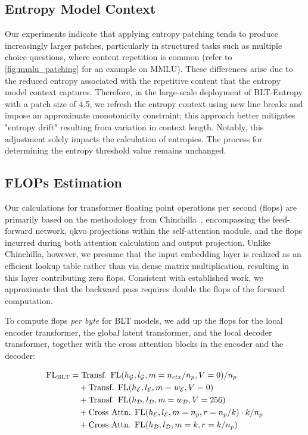 \subsection{Entropy Model Context}
\label{section:entropy-context}
Our experiments indicate that applying entropy patching tends to produce increasingly larger patches, particularly in structured tasks such as multiple choice questions, where content repetition is common (refer to \autoref{fig:mmlu_patching} for an example on MMLU). These differences arise due to the reduced entropy associated with the repetitive content that the entropy model context captures. Therefore, in the large-scale deployment of {\textsc BLT}-Entropy with a patch size of 4.5, we refresh the entropy context using new line breaks and impose an approximate monotonicity constraint; this approach better mitigates "entropy drift" resulting from variation in context length. Notably, this adjustment solely impacts the calculation of entropies. The process for determining the entropy threshold value remains unchanged.

\subsection{FLOPs Estimation} 
\label{section:flops}

Our calculations for transformer floating point operations per second (flops) are primarily based on the methodology from Chinchilla~\citep{hoffmann2022training}, encompassing the feed-forward network, qkvo projections within the self-attention module, and the flops incurred during both attention calculation and output projection. Unlike Chinchilla, however, we presume that the input embedding layer is realized as an efficient lookup table rather than via dense matrix multiplication, resulting in this layer contributing zero flops. Consistent with established work, we approximate that the backward pass requires double the flops of the forward computation.

To compute flops \textit{per byte} for {\textsc BLT} models, we add up the flops for the local encoder transformer, the global latent transformer, and the local decoder transformer, together with the cross attention blocks in the encoder and the decoder:

\begin{align}
    \text{FL}_{\text{{\textsc BLT}}} &= \text{Transf. FL}(h_{\mathcal{G}}, l_{\mathcal{G}}, m=n_{ctx}/n_p, V=0) / n_p\\
   &\quad +\text{Transf. FL}(h_{\mathcal{E}}, l_{\mathcal{E}}, m=w_{\mathcal{E}}, V=0) \\
   &\quad + \text{Transf. FL}(h_{\mathcal{D}}, l_{\mathcal{D}}, m=w_{\mathcal{D}}, V=256) \\ 
    &\quad + \text{Cross Attn. FL}(h_{\mathcal{E}}, l_{\mathcal{E}}, m=n_p, r=n_p/k) \cdot k/n_p \\ 
   &\quad + \text{Cross Attn. FL}(h_{\mathcal{D}}, l_{\mathcal{D}}, m=k, r=k/n_p) 
\end{align}

